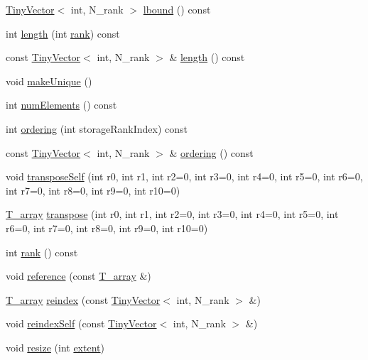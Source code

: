 \begin{DoxyCompactItemize}
\item 
\hyperlink{classTinyVector}{Tiny\+Vector}$<$ int, N\+\_\+rank $>$ \hyperlink{classArray_a155ceb0f9cc12e4c8e0dad380607f522}{lbound} () const 
\item 
int \hyperlink{classArray_a11c4ec818e48dfdc79a9ee9c58a17ed3}{length} (int \hyperlink{classArray_a1563c492c1be9d9b95a3f53d9cd89fae}{rank}) const 
\item 
const \hyperlink{classTinyVector}{Tiny\+Vector}$<$ int, N\+\_\+rank $>$ \& \hyperlink{classArray_a3fb4906eee4cc7dd70a36b91ca0d6e62}{length} () const 
\item 
void \hyperlink{classArray_ac81798775d9c34b90101510cfddf1643}{make\+Unique} ()
\item 
int \hyperlink{classArray_a333fb3ec984bb54deac85aa35654b204}{num\+Elements} () const 
\item 
int \hyperlink{classArray_a7ed8835e2688a94d66a2ca953ae0b1cf}{ordering} (int storage\+Rank\+Index) const 
\item 
const \hyperlink{classTinyVector}{Tiny\+Vector}$<$ int, N\+\_\+rank $>$ \& \hyperlink{classArray_a4698d990150249236c503cd17f54a3e9}{ordering} () const 
\item 
void \hyperlink{classArray_a21add749c176f45a5a8e14d5e5067936}{transpose\+Self} (int r0, int r1, int r2=0, int r3=0, int r4=0, int r5=0, int r6=0, int r7=0, int r8=0, int r9=0, int r10=0)
\item 
\hyperlink{classArray_a6a3d9b6a214107a10df219091801f1e0}{T\+\_\+array} \hyperlink{classArray_a872c71f42d036ab09d6817dec54a473a}{transpose} (int r0, int r1, int r2=0, int r3=0, int r4=0, int r5=0, int r6=0, int r7=0, int r8=0, int r9=0, int r10=0)
\item 
int \hyperlink{classArray_a1563c492c1be9d9b95a3f53d9cd89fae}{rank} () const 
\item 
void \hyperlink{classArray_a29647009b556bbddaa71c10ad2256f4c}{reference} (const \hyperlink{classArray_a6a3d9b6a214107a10df219091801f1e0}{T\+\_\+array} \&)
\item 
\hyperlink{classArray_a6a3d9b6a214107a10df219091801f1e0}{T\+\_\+array} \hyperlink{classArray_afe04db0b0e963dc4ab87fb0c4c2888cc}{reindex} (const \hyperlink{classTinyVector}{Tiny\+Vector}$<$ int, N\+\_\+rank $>$ \&)
\item 
void \hyperlink{classArray_a788be452369ac046def7af65c12f1bbc}{reindex\+Self} (const \hyperlink{classTinyVector}{Tiny\+Vector}$<$ int, N\+\_\+rank $>$ \&)
\item 
void \hyperlink{classArray_a0424fd6f39f538181c81e4e88d00ca06}{resize} (int \hyperlink{classArray_a0e366d6568c6f976ea3657fea13794b7}{extent})

\end{DoxyCompactItemize}
